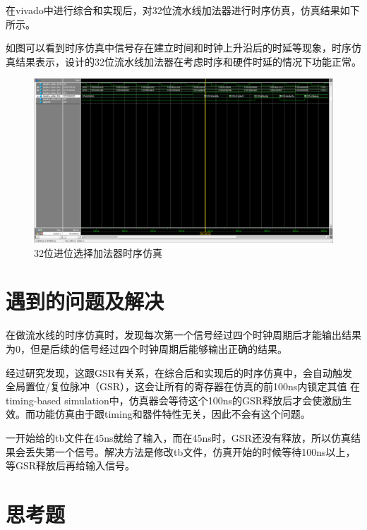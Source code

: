 \documentclass[12pt,hyperref,a4paper,UTF8]{ctexart}
\begin{document}
  \newpage
  在vivado中进行综合和实现后，对32位流水线加法器进行时序仿真，仿真结果如下所示。

  如图可以看到时序仿真中信号存在建立时间和时钟上升沿后的时延等现象，时序仿真结果表示，设计的32位流水线加法器在考虑时序和硬件时延的情况下功能正常。


  \begin{figure}[H]
      \centering
      \includegraphics[width =1.0\textwidth]{figures/fig/Snipaste_2024-09-23_09-43-14.png}
      \caption{32位进位选择加法器时序仿真}
      \label{fig:enter-label}
  \end{figure}

\section{遇到的问题及解决}
在做流水线的时序仿真时，发现每次第一个信号经过四个时钟周期后才能输出结果为0，但是后续的信号经过四个时钟周期后能够输出正确的结果。

经过研究发现，这跟GSR有关系，在综合后和实现后的时序仿真中，会自动触发全局置位/复位脉冲（GSR），这会让所有的寄存器在仿真的前100ns内锁定其值
在timing-based simulation中，仿真器会等待这个100ns的GSR释放后才会使激励生效。而功能仿真由于跟timing和器件特性无关，因此不会有这个问题。

一开始给的tb文件在45ns就给了输入，而在45ns时，GSR还没有释放，所以仿真结果会丢失第一个信号。解决方法是修改tb文件，仿真开始的时候等待100ns以上，等GSR释放后再给输入信号。
\newpage
\section{思考题}
\end{document}
